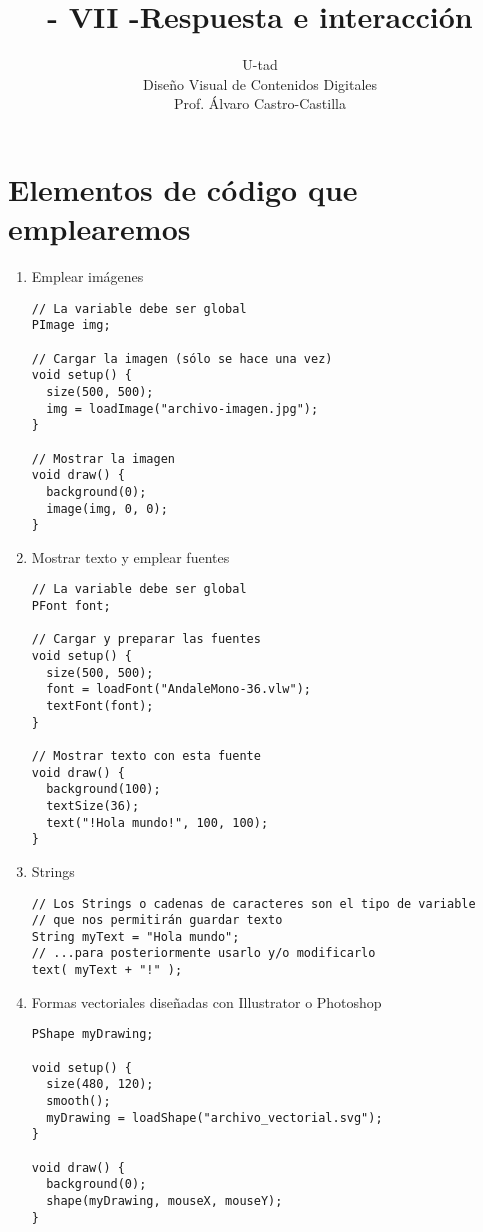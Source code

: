 \documentclass[a4paper,oneside]{article}
\title{- VII -\linebreak Respuesta e interacción}
\author{U-tad\\ Diseño Visual de Contenidos Digitales\\ Prof. Álvaro Castro-Castilla}
\date{}
\begin{document}
\maketitle


\section{Elementos de código que emplearemos}
\begin{enumerate}
  \item Emplear imágenes

    \begin{verbatim}
// La variable debe ser global
PImage img;

// Cargar la imagen (sólo se hace una vez)
void setup() {
  size(500, 500);
  img = loadImage("archivo-imagen.jpg");
}

// Mostrar la imagen
void draw() {
  background(0);
  image(img, 0, 0);
}
    \end{verbatim}

  \item Mostrar texto y emplear fuentes

    \begin{verbatim}
// La variable debe ser global
PFont font;

// Cargar y preparar las fuentes
void setup() {
  size(500, 500);
  font = loadFont("AndaleMono-36.vlw");
  textFont(font);
}

// Mostrar texto con esta fuente
void draw() {
  background(100);
  textSize(36);
  text("!Hola mundo!", 100, 100);
}
    \end{verbatim}
      
  \item Strings

    \begin{verbatim}
// Los Strings o cadenas de caracteres son el tipo de variable
// que nos permitirán guardar texto
String myText = "Hola mundo";
// ...para posteriormente usarlo y/o modificarlo
text( myText + "!" );
    \end{verbatim}

  \item Formas vectoriales diseñadas con Illustrator o Photoshop

    \begin{verbatim}
PShape myDrawing;

void setup() {
  size(480, 120);
  smooth();
  myDrawing = loadShape("archivo_vectorial.svg");
}

void draw() {
  background(0);
  shape(myDrawing, mouseX, mouseY);
}
    \end{verbatim}

\end{enumerate}
\end{document}
